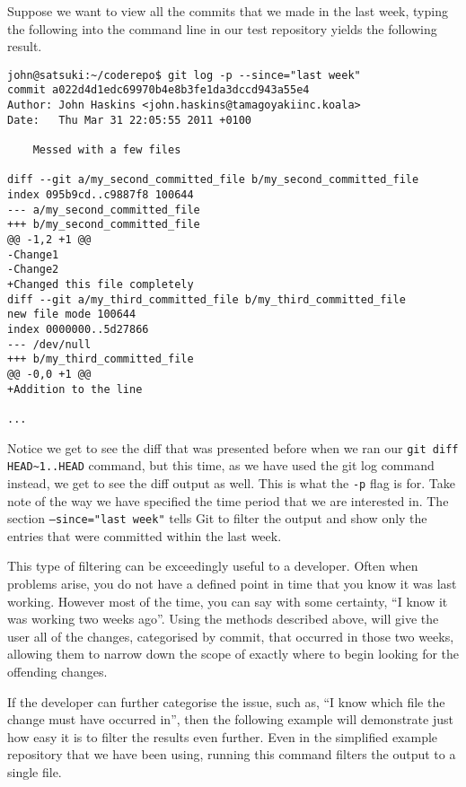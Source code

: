 Suppose we want to view all the commits that we made in the last week, typing the following into the command line in our test repository yields the following result.

\begin{Verbatim}[frame=leftline,framerule=1mm,fontsize=\relsize{-3}] 
john@satsuki:~/coderepo$ git log -p --since="last week"
commit a022d4d1edc69970b4e8b3fe1da3dccd943a55e4
Author: John Haskins <john.haskins@tamagoyakiinc.koala>
Date:   Thu Mar 31 22:05:55 2011 +0100

    Messed with a few files

diff --git a/my_second_committed_file b/my_second_committed_file
index 095b9cd..c9887f8 100644
--- a/my_second_committed_file
+++ b/my_second_committed_file
@@ -1,2 +1 @@
-Change1
-Change2
+Changed this file completely
diff --git a/my_third_committed_file b/my_third_committed_file
new file mode 100644
index 0000000..5d27866
--- /dev/null
+++ b/my_third_committed_file
@@ -0,0 +1 @@
+Addition to the line

...
\end{Verbatim}

Notice we get to see the diff that was presented before when we ran our \texttt{git diff HEAD\textasciitilde1..HEAD} command, but this time, as we have used the git log command instead, we get to see the diff output as well.  This is what the \texttt{-p} flag is for.  Take note of the way we have specified the time period that we are interested in.  The section \texttt{--since="last week"} tells Git to filter the output and show only the entries that were committed within the last week.

This type of filtering can be exceedingly useful to a developer.  Often when problems arise, you do not have a defined point in time that you know it was last working.  However most of the time, you can say with some certainty, ``I know it was working two weeks ago''.  Using the methods described above, will give the user all of the changes, categorised by commit, that occurred in those two weeks, allowing them to narrow down the scope of exactly where to begin looking for the offending changes.

If the developer can further categorise the issue, such as, ``I know which file the change must have occurred in'', then the following example will demonstrate just how easy it is to filter the results even further.  Even in the simplified example repository that we have been using, running this command filters the output to a single file.

